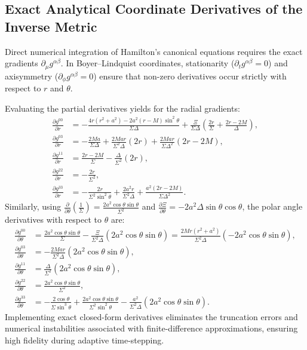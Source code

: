 \subsection{Exact Analytical Coordinate Derivatives of the Inverse Metric}
Direct numerical integration of Hamilton's canonical equations requires the exact gradients $\partial_\mu g^{\alpha\beta}$. In Boyer--Lindquist coordinates, stationarity ($\partial_t g^{\alpha\beta} = 0$) and axisymmetry ($\partial_\phi g^{\alpha\beta} = 0$) ensure that non-zero derivatives occur strictly with respect to $r$ and $\theta$.

Evaluating the partial derivatives yields for the radial gradients:
\begin{align}
    \frac{\partial g^{00}}{\partial r} &= -\frac{4r(r^2 + a^2) - 2a^2(r - M)\sin^2\theta}{\Sigma\Delta} + \frac{\Xi}{\Sigma\Delta}\left(\frac{2r}{\Sigma} + \frac{2r - 2M}{\Delta}\right), \label{eq:dg_dr_00} \\
    \frac{\partial g^{03}}{\partial r} &= -\frac{2Ma}{\Sigma\Delta} + \frac{2Mar}{\Sigma^2\Delta}(2r) + \frac{2Mar}{\Sigma\Delta^2}(2r - 2M), \label{eq:dg_dr_03} \\
    \frac{\partial g^{11}}{\partial r} &= \frac{2r - 2M}{\Sigma} - \frac{\Delta}{\Sigma^2}(2r), \label{eq:dg_dr_11} \\
    \frac{\partial g^{22}}{\partial r} &= -\frac{2r}{\Sigma^2}, \label{eq:dg_dr_22} \\
    \frac{\partial g^{33}}{\partial r} &= -\frac{2r}{\Sigma^2\sin^2\theta} + \frac{2a^2 r}{\Sigma^2\Delta} + \frac{a^2(2r - 2M)}{\Sigma\Delta^2}. \label{eq:dg_dr_33}
\end{align}
Similarly, using $\frac{\partial}{\partial\theta}\left(\frac{1}{\Sigma}\right) = \frac{2a^2\cos\theta\sin\theta}{\Sigma^2}$ and $\frac{\partial\Xi}{\partial\theta} = -2a^2\Delta\sin\theta\cos\theta$, the polar angle derivatives with respect to $\theta$ are:
\begin{align}
    \frac{\partial g^{00}}{\partial \theta} &= \frac{2a^2\cos\theta\sin\theta}{\Sigma} - \frac{\Xi}{\Sigma^2\Delta}(2a^2\cos\theta\sin\theta) = \frac{2Mr(r^2 + a^2)}{\Sigma^2\Delta}\left(-2a^2\cos\theta\sin\theta\right), \label{eq:dg_dth_00} \\
    \frac{\partial g^{03}}{\partial \theta} &= -\frac{2Mar}{\Sigma^2\Delta}(2a^2\cos\theta\sin\theta), \label{eq:dg_dth_03} \\
    \frac{\partial g^{11}}{\partial \theta} &= \frac{\Delta}{\Sigma^2}(2a^2\cos\theta\sin\theta), \label{eq:dg_dth_11} \\
    \frac{\partial g^{22}}{\partial \theta} &= \frac{2a^2\cos\theta\sin\theta}{\Sigma^2}, \label{eq:dg_dth_22} \\
    \frac{\partial g^{33}}{\partial \theta} &= -\frac{2\cos\theta}{\Sigma\sin^3\theta} + \frac{2a^2\cos\theta\sin\theta}{\Sigma^2\sin^2\theta} - \frac{a^2}{\Sigma^2\Delta}(2a^2\cos\theta\sin\theta). \label{eq:dg_dth_33}
\end{align}
Implementing exact closed-form derivatives eliminates the truncation errors and numerical instabilities associated with finite-difference approximations, ensuring high fidelity during adaptive time-stepping.
